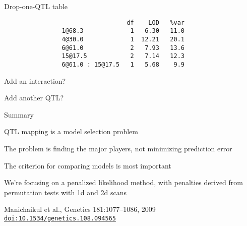 \documentclass[aspectratio=169,12pt,t]{beamer}
\begin{document}
\begin{frame}[fragile,c]{Drop-one-QTL table}

\begin{verbatim}
                                  df    LOD   %var
                1@68.3             1   6.30   11.0
                4@30.0             1  12.21   20.1
                6@61.0             2   7.93   13.6
                15@17.5            2   7.14   12.3
                6@61.0 : 15@17.5   1   5.68    9.9
\end{verbatim}

\note{
}
\end{frame}




\begin{frame}[c]{Add an interaction?}


\note{
}
\end{frame}



\begin{frame}[c]{Add another QTL?}


\note{
}
\end{frame}







\begin{frame}{Summary}


\bbi
\item QTL mapping is a model selection problem
\item The problem is finding the major players, not minimizing
  prediction error
\item The criterion for comparing models is most important
\item We're focusing on a penalized likelihood method, with penalties
  derived from permutation tests with 1d and 2d scans
\item Manichaikul et al., Genetics 181:1077--1086, 2009 \\
  \href{https://doi.org/10.1534/genetics.108.094565}{\tt doi:10.1534/genetics.108.094565}
\ei

\note{
}
\end{frame}
\end{document}
